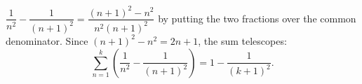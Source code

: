 $\dfrac1{n^2}-\dfrac1{(n+1)^2}=\dfrac{(n+1)^2-n^2}{n^2(n+1)^2}$ by putting the two fractions over the common denominator. Since $(n+1)^2-n^2=2n+1$, the sum telescopes:
\[\sum_{n=1}^k\left(\dfrac1{n^2}-\dfrac1{(n+1)^2}\right)=\boxed{1-\dfrac1{(k+1)^2}}.\]
